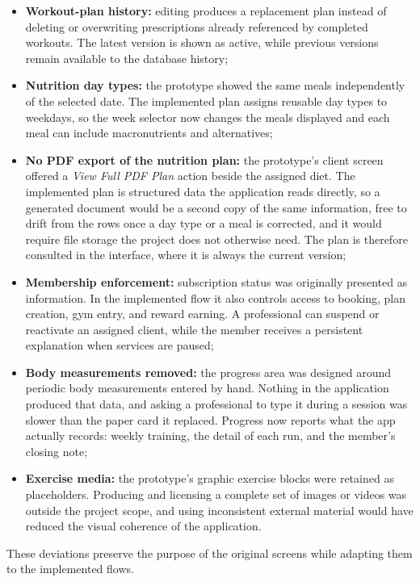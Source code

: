 \begin{itemize}
    \item \textbf{Workout-plan history:} editing produces a replacement plan instead of deleting or overwriting prescriptions already referenced by completed workouts. The latest version is shown as active, while previous versions remain available to the database history;
    \item \textbf{Nutrition day types:} the prototype showed the same meals independently of the selected date. The implemented plan assigns reusable day types to weekdays, so the week selector now changes the meals displayed and each meal can include macronutrients and alternatives;
    \item \textbf{No PDF export of the nutrition plan:} the prototype's client screen offered a \textit{View Full PDF Plan} action beside the assigned diet. The implemented plan is structured data the application reads directly, so a generated document would be a second copy of the same information, free to drift from the rows once a day type or a meal is corrected, and it would require file storage the project does not otherwise need. The plan is therefore consulted in the interface, where it is always the current version;
    \item \textbf{Membership enforcement:} subscription status was originally presented as information. In the implemented flow it also controls access to booking, plan creation, gym entry, and reward earning. A professional can suspend or reactivate an assigned client, while the member receives a persistent explanation when services are paused;
    \item \textbf{Body measurements removed:} the progress area was designed around periodic body measurements entered by hand. Nothing in the application produced that data, and asking a professional to type it during a session was slower than the paper card it replaced. Progress now reports what the app actually records: weekly training, the detail of each run, and the member's closing note;
    \item \textbf{Exercise media:} the prototype's graphic exercise blocks were retained as placeholders. Producing and licensing a complete set of images or videos was outside the project scope, and using inconsistent external material would have reduced the visual coherence of the application.
\end{itemize}

These deviations preserve the purpose of the original screens while adapting them to the implemented flows.

